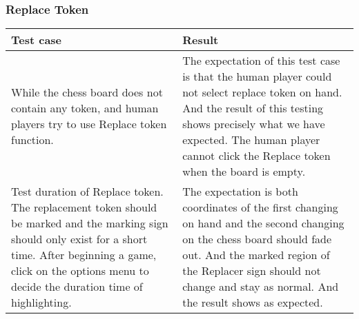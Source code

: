 \newpage
\subsubsection{Replace Token}

\begin{table}[h]
	\centering
	\begin{tabular}{p{7cm}@{\hskip 5mm}  p{7cm}} 
		\toprule
		Test case   & Result   \\ 
		\midrule
		\midrule
    	While the chess board does not contain any token, and human players try to use Replace token function. & The expectation of this test case is that the human player could not select replace token on hand. And the result of this testing shows precisely what we have expected. The human player cannot click the Replace token when the board is empty.  \\ 
		\midrule
		Test duration of Replace token. The replacement token should be marked and the marking sign should only exist for a short time. After beginning a game, click on the options menu to decide the duration time of highlighting. & The expectation is both coordinates of the first changing on hand and the second changing on the chess board should fade out. And the marked region of the Replacer sign should not change and stay as normal. And the result shows as expected. \\
		\bottomrule
	\end{tabular}
\end{table}

